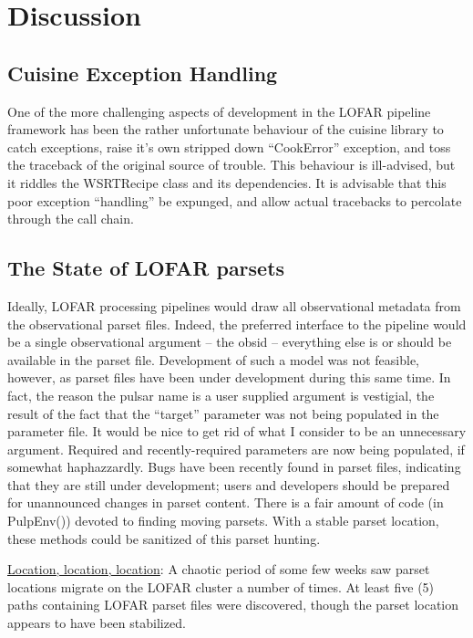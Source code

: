 \documentclass[a4paper,10pt,bibtotoc]{scrartcl}
\begin{document}
\section{Discussion}
\label{sec:discussion}
\subsection{Cuisine Exception Handling}
One of the more challenging aspects of development in the LOFAR
pipeline framework has been the rather unfortunate behaviour of the
cuisine library to catch exceptions, raise it's own stripped down
``CookError'' exception, and toss the traceback of the original source
of trouble.  This behaviour is ill-advised, but it riddles the
WSRTRecipe class and its dependencies.  It is advisable that this poor
exception ``handling'' be expunged, and allow actual tracebacks to
percolate through the call chain.

\subsection{The State of LOFAR parsets}
Ideally, LOFAR processing pipelines would draw all observational
metadata from the observational parset files.  Indeed, the preferred
interface to the pipeline would be a single observational argument --
the obsid -- everything else is or should be available in the parset
file. Development of such a model was not feasible, however, as parset
files have been under development during this same time.  In fact, the
reason the pulsar name is a user supplied argument is vestigial, the
result of the fact that the ``target'' parameter was not being
populated in the parameter file. It would be nice to get rid of what I
consider to be an unnecessary argument. Required and recently-required
parameters are now being populated, if somewhat haphazzardly.  Bugs
have been recently found in parset files, indicating that they are
still under development; users and developers should be prepared for
unannounced changes in parset content.  There is a fair amount of code
(in PulpEnv()) devoted to finding moving parsets.  With a stable
parset location, these methods could be sanitized of this parset
hunting.

\underline{Location, location, location}: A chaotic period of some few
weeks saw parset locations migrate on the LOFAR cluster a number of
times. At least five (5) paths containing LOFAR parset files were
discovered, though the parset location appears to have been stabilized.
\end{document}
